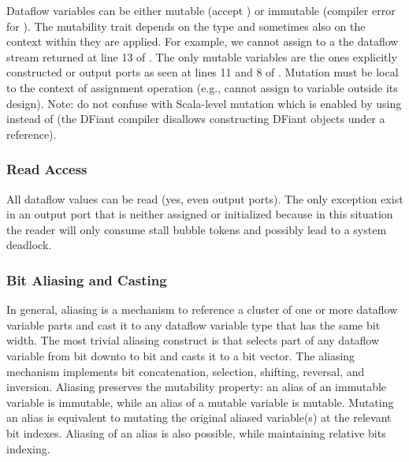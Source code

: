 Dataflow variables can be either mutable (accept \code{:=}) or immutable (compiler error for \code{:=}). The mutability trait depends on the type and sometimes also on the context within they are applied. For example, we cannot assign to a the dataflow stream returned at line 13 of . The only mutable variables are the ones explicitly constructed or output ports as seen at lines 11 and 8 of . Mutation must be local to the context of assignment operation (e.g., cannot assign to variable outside its design).
Note: do not confuse with Scala-level mutation which is enabled by using  instead of  (the DFiant compiler disallows constructing DFiant objects under a  reference). 

\subsubsection{Read Access}
All dataflow values can be read (yes, even output ports). The only exception exist in an output port that is neither assigned or initialized because in this situation the reader will only consume stall bubble tokens and possibly lead to a system deadlock.

\subsubsection{Bit Aliasing and Casting} 
In general, aliasing is a mechanism to reference a cluster of one or more dataflow variable parts and cast it to any dataflow variable type that has the same bit width. The most trivial aliasing construct is  that selects part of any dataflow variable from bit  downto to bit  and casts it to a bit vector. The aliasing mechanism implements bit concatenation, selection, shifting, reversal, and inversion. Aliasing preserves the mutability property: an alias of an immutable variable is immutable, while an alias of a mutable variable is mutable. Mutating an alias is equivalent to mutating the original aliased variable(s) at the relevant bit indexes. Aliasing of an alias is also possible, while maintaining relative bits indexing.  

